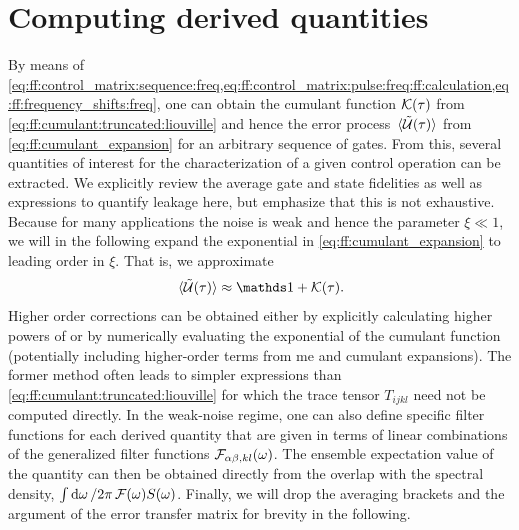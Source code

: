 \section{Computing derived quantities}\label{sec:ff:theory:derived_quantities}
By means of \cref{eq:ff:control_matrix:sequence:freq,eq:ff:control_matrix:pulse:freq:ff:calculation,eq:ff:frequency_shifts:freq}, one can obtain the cumulant function $\mathcal{K}(\tau)$ from \cref{eq:ff:cumulant:truncated:liouville} and hence the error process $\expval*{\mathcal{\tilde{U}}(\tau)}$ from \cref{eq:ff:cumulant_expansion} for an arbitrary sequence of gates.
From this, several quantities of interest for the characterization of a given control operation can be extracted.
We explicitly review the average gate and state fidelities as well as expressions to quantify leakage here, but emphasize that this is not exhaustive.
Because for many applications the noise is weak and hence the parameter $\xi\ll 1$, we will in the following expand the exponential in \cref{eq:ff:cumulant_expansion} to leading order in $\xi$.
That is, we approximate
\begin{equation}\label{eq:ff:error_transfer_matrix:approx}
    \liouvUetavg\approx\eye + \cumulantfun(\tau).
\end{equation}
Higher order corrections can be obtained either by explicitly calculating higher powers of \cumulantfun or by numerically evaluating the exponential of the cumulant function (potentially including higher-order terms from \gls{me} and cumulant expansions).
The former method often leads to simpler expressions than \cref{eq:ff:cumulant:truncated:liouville} for which the trace tensor $T_{ijkl}$ need not be computed directly.
In the weak-noise regime, one can also define specific filter functions for each derived quantity that are given in terms of linear combinations of the generalized filter functions $\mathcal{F}_{\alpha\beta,kl}(\omega)$.
The ensemble expectation value of the quantity can then be obtained directly from the overlap with the spectral density, $\int\dd{\omega}/2\pi\,\mathcal{F}(\omega) S(\omega)$.
Finally, we will drop the averaging brackets and the argument of the error transfer matrix \liouvUetavg for brevity in the following.

